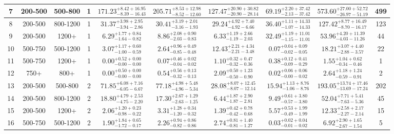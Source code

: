 \documentclass[11pt, oneside]{article}   	%
\begin{document}
\begin{table}
{\begin{tabular}{ |c|c|c|c||c|c|c|c||c|c| }
7 & 200-500 & 500-800 & 1 & $171.23^{+8.42+16.95}_{-8.39-16.43}$ & $205.71^{+8.53+12.98}_{-8.52-12.60}$ & $127.47^{+20.90+30.82}_{-20.90-28.14}$ & $69.19^{+2.20+37.42}_{-2.13-37.42}$ & $573.60^{+27.00+52.72}_{-26.97-51.19}$ & 499 \\ \hline
8 & 200-500 & 800-1200 & 1 & $31.37^{+3.98+2.95}_{-3.94-2.86}$ & $30.41^{+3.19+2.01}_{-3.16-1.93}$ & $29.24^{+4.92+7.40}_{-4.92-6.66}$ & $36.40^{+1.11+14.33}_{-1.07-14.33}$ & $127.42^{+8.77+16.49}_{-8.70-16.17}$ & 123 \\ \hline
9 & 200-500 & 1200+ & 1 & $6.29^{+1.77+0.84}_{-1.64-0.82}$ & $8.86^{+2.08+0.90}_{-2.03-0.83}$ & $6.33^{+1.19+2.66}_{-1.19-2.03}$ & $32.49^{+1.19+11.01}_{-1.15-11.01}$ & $53.96^{+4.20+11.39}_{-4.03-11.26}$ & 44 \\ \hline
10 & 500-750 & 500-1200 & 1 & $3.07^{+1.17+0.60}_{-1.00-0.59}$ & $2.64^{+0.96+0.49}_{-0.85-0.48}$ & $12.43^{+2.21+4.34}_{-2.21-3.48}$ & $0.07^{+0.04+0.09}_{-0.02-0.05}$ & $18.21^{+3.07+4.40}_{-2.88-3.57}$ & 22 \\ \hline
11 & 500-750 & 1200+ & 1 & $0.00^{+0.52+0.00}_{-0.00-0.00}$ & $0.07^{+0.46+0.02}_{-0.04-0.02}$ & $1.10^{+0.32+0.47}_{-0.32-0.36}$ & $0.38^{+0.12+0.41}_{-0.09-0.29}$ & $1.55^{+1.04+0.62}_{-0.34-0.46}$ & 1 \\ \hline
12 & 750+ & 800+ & 1 & $0.00^{+0.50+0.00}_{-0.00-0.00}$ & $0.54^{+0.56+0.13}_{-0.32-0.13}$ & $2.09^{+0.50+1.23}_{-0.50-0.90}$ & $0.02^{+0.06+0.06}_{-0.00-0.02}$ & $2.64^{+1.18+1.24}_{-0.59-0.91}$ & 2 \\ \hline
13 & 200-500 & 500-800 & 2 & $71.85^{+6.08+7.16}_{-6.05-6.67}$ & $77.18^{+4.98+5.48}_{-4.96-5.34}$ & $28.08^{+8.07+12.45}_{-8.07-12.14}$ & $15.94^{+1.13+8.76}_{-1.06-8.76}$ & $193.05^{+13.74+17.46}_{-13.69-17.24}$ & 202 \\ \hline
14 & 200-500 & 800-1200 & 2 & $18.80^{+4.79+2.53}_{-4.75-2.20}$ & $17.30^{+2.67+1.29}_{-2.63-1.25}$ & $6.44^{+1.87+2.90}_{-1.87-2.81}$ & $9.49^{+0.61+3.80}_{-0.57-3.80}$ & $52.04^{+7.71+5.41}_{-7.63-5.36}$ & 45 \\ \hline
15 & 200-500 & 1200+ & 2 & $2.06^{+1.20+0.23}_{-0.98-0.22}$ & $3.31^{+1.28+0.34}_{-1.20-0.32}$ & $1.39^{+0.42+0.78}_{-0.42-0.68}$ & $5.57^{+0.53+1.99}_{-0.49-1.99}$ & $12.33^{+2.58+2.17}_{-2.27-2.14}$ & 15 \\ \hline
16 & 500-750 & 500-1200 & 2 & $1.90^{+1.84+0.65}_{-1.72-0.17}$ & $2.26^{+0.94+0.86}_{-0.82-0.86}$ & $2.74^{+0.81+1.40}_{-0.81-1.27}$ & $0.03^{+0.02+0.04}_{-0.01-0.02}$ & $6.92^{+2.90+1.65}_{-2.67-1.54}$ & 5 \\ \hline

\end{tabular}}
\end{table}
\end{document}
